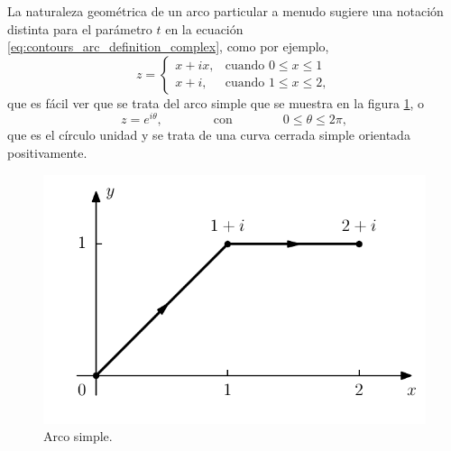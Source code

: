 \documentclass[a4paper]{report}
\begin{document}
La naturaleza geométrica de un arco particular a menudo sugiere una notación distinta para el parámetro \(t\) en la ecuación \ref{eq:contours_arc_definition_complex}, como por ejemplo,
\[
 z=\left\{ 
 \begin{array}{ll}
  x+ix,&\textrm{cuando }0\leq x\leq1\\
  x+i,&\textrm{cuando }1\leq x\leq2,
 \end{array}
 \right.
\]
que es fácil ver que se trata del arco simple que se muestra en la figura \ref{fig:example_43_01_polygonal_line_contour}, o 
\[
 z=e^{i\theta},\qquad\qquad\textrm{con}\qquad\qquad 0\leq\theta\leq2\pi,
\]
que es el círculo unidad y se trata de una curva cerrada simple orientada positivamente.
\begin{figure}[!htb]
  \begin{minipage}[c]{0.5\textwidth}
    \includegraphics[width=\textwidth]{figuras/example_43_01_polygonal_line_contour.pdf}
  \end{minipage}\hfill
  \begin{minipage}[c]{0.4\textwidth}
    \caption{
       Arco simple.
    }\label{fig:example_43_01_polygonal_line_contour}
  \end{minipage}
\end{figure}
\end{document}

